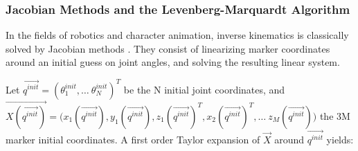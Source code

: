 \newpage
\subsubsection{Jacobian Methods and the Levenberg-Marquardt Algorithm}\label{levenberg}

In the fields of robotics and character animation, inverse kinematics is classically solved by Jacobian methods \cite{Siciliano1990,Buss2009,Aristidou2018}. They consist of linearizing marker coordinates around an initial guess on joint angles, and solving the resulting linear system. %

Let $\overrightarrow{q^{init}}=(\theta_1^{init}, \dots \  \theta_N^{init})^T$ be the N initial joint coordinates, and \\
$\overrightarrow{X(\overrightarrow{q^{init}})} = \bigl(x_1(\overrightarrow{q^{init}}), y_1(\overrightarrow{q^{init}}), z_1(\overrightarrow{q^{init}})^T, x_2(\overrightarrow{q^{init}})^T, \dots \ z_M(\overrightarrow{q^{init}})\bigr)$ the 3M marker initial coordinates. A first order Taylor expansion of $\overrightarrow{X}$ around $\overrightarrow{q^{init}}$ yields:
